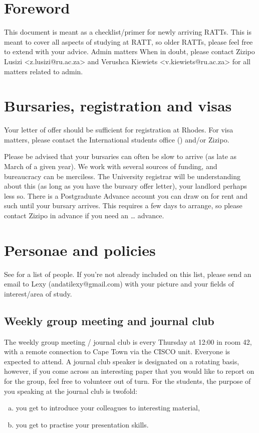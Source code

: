 \section{Foreword}
This document is meant as a checklist/primer for newly arriving RATTs. This is meant to cover all aspects of studying at RATT, so older RATTs, please feel free to extend with your advice.
Admin matters
When in doubt, please contact Zizipo Lusizi <z.lusizi@ru.ac.za> and Verushca Kiewiets <v.kiewiets@ru.ac.za> for all matters related to admin.

\section{Bursaries, registration and visas}
Your letter of offer should be sufficient for registration at Rhodes. For visa matters, please contact the International students office () and/or Zizipo.

Please be advised that your bursaries can often be slow to arrive (as late as March of a given year). We work with several sources of funding, and bureaucracy can be merciless. The University registrar will be understanding about this (as long as you have the bursary offer letter), your landlord perhaps less so. There is a Postgraduate Advance account you can draw on for rent and such until your bursary arrives. This requires a few days to arrange, so please contact Zizipo in advance if you need an … advance.


\section{Personae and policies}
See  for a list of people. If you’re not already included on this list, please send an email to Lexy (andatilexy@gmail.com) with your picture and your fields of interest/area of study.

\subsection{Weekly group meeting and journal club }
The weekly group meeting / journal club is every Thursday at 12:00 in room 42, with a remote connection to Cape Town via the CISCO unit. Everyone is expected to attend. A journal club speaker is designated on a rotating basis, however, if you come across an interesting paper that you would like to report on for the group, feel free to volunteer out of turn.
For the students, the purpose of you speaking at the journal club is twofold: 
\begin{enumerate}[(a)]
    \item you get to introduce your colleagues to interesting material, 
    \item you get to practise your presentation skills. 
\end{enumerate}

